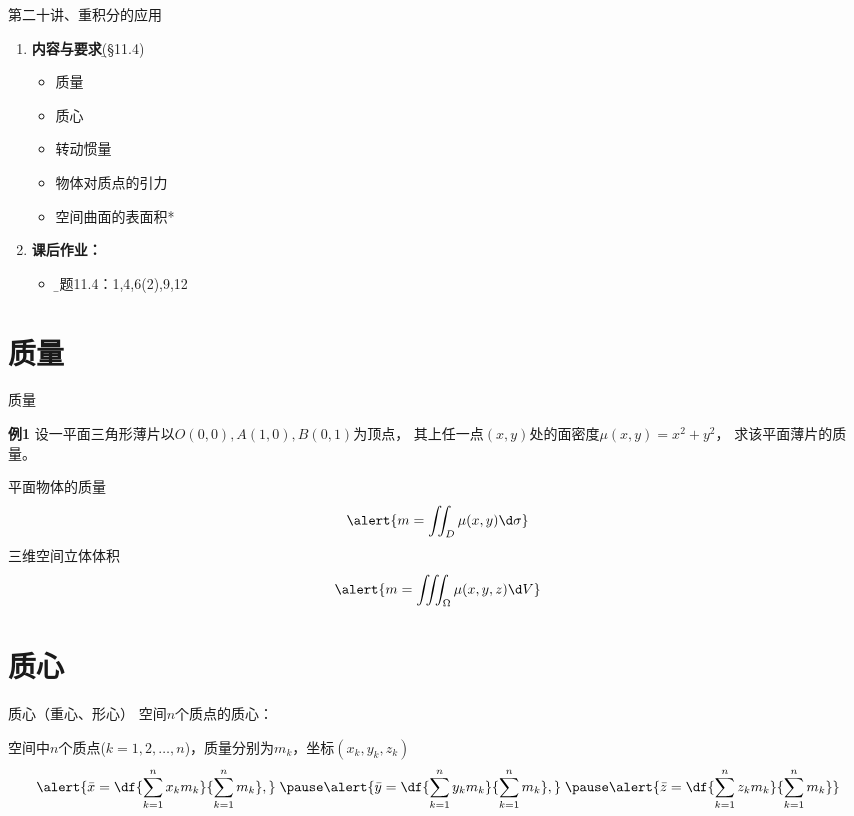 
\begin{frame}{第二十讲、重积分的应用}
	\linespread{1.5}
	\begin{enumerate}
	  \item {\bf 内容与要求}{\b (\S 11.4)}
	  \begin{itemize}
		\item 质量
		\item 质心
		\item 转动惯量
	    \item 物体对质点的引力
	    \item 空间曲面的表面积*
	  \vspace{1em}
	  \end{itemize}
	  \item {\bf  课后作业：}
	  \begin{itemize}
	    \item {\b 习题11.4：1,4,6(2),9,12}
	  \end{itemize}
	\end{enumerate}
\end{frame}

\section{质量}

\begin{frame}{质量}
	\linespread{1.2}
	\begin{exampleblock}{{\bf 例1}\hfill}
		设一平面三角形薄片以$O(0,0),A(1,0),B(0,1)$为顶点，
		其上任一点$(x,y)$处的面密度$\mu(x,y)=x^2+y^2$，
		求该平面薄片的质量。
	\end{exampleblock}
	\pause
	{\bb 平面物体的质量}
	$$\alert{m=\iint_D\mu(x,y)\d\sigma}$$
	\pause
	{\bb 三维空间立体体积}
	$$\alert{m=\iiint_{\Omega}\mu(x,y,z)\d V}$$
\end{frame}

\section{质心}

\begin{frame}{质心（重心、形心）}
	\linespread{1.2}\pause 
	{\bb 空间$n$个质点的质心：}\pause
	
	空间中$n$个质点($k=1,2,\ldots,n$)，质量分别为$m_k$，坐标$(x_k,y_k,z_k)$\pause
	$$\alert{\bar{x}=\df{\sum\limits_{k=1}^nx_km_k}{\sum\limits_{k=1}^nm_k},}\;\pause
	\alert{\bar{y}=\df{\sum\limits_{k=1}^ny_km_k}{\sum\limits_{k=1}^nm_k},}\;\pause 
	\alert{\bar{z}=\df{\sum\limits_{k=1}^nz_km_k}{\sum\limits_{k=1}^nm_k}}$$
\end{frame}

